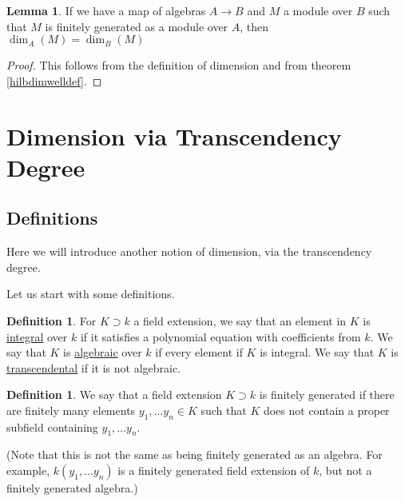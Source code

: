 \documentclass[12 pt]{article}
\theoremstyle{definition}
\newtheorem{lemma}[thm]{Lemma}
\newtheorem{defn}[thm]{Definition}
\renewcommand{\(}{\left(}
\renewcommand{\)}{\right)}
\begin{document}
\begin{lemma} If we have a map of algebras $A \to B$ and $M$ a module over $B$ such that $M$ is finitely generated as a module over $A$, then $\dim_A(M)=\dim_B(M)$
\end{lemma}
\begin{proof} This follows from the definition of dimension and from theorem \ref{hilbdimwelldef}.
\end{proof}


\newpage





\section{Dimension via Transcendency Degree}

\subsection{Definitions}

Here we will introduce another notion of dimension, via the transcendency degree.

Let us start with some definitions.

\begin{defn} For $K \supset k$ a field extension, we say that an element in $K$ is \underline{integral} over $k$ if it satisfies a polynomial equation with coefficients from $k$. We say that $K$ is \underline{algebraic} over $k$ if every element if $K$ is integral. We say that $K$ is \underline{transcendental} if it is not algebraic.
\end{defn}


\begin{defn} We say that a field extension $K \supset k$ is finitely generated if there are finitely many elements $y_1, \ldots y_n \in K$ such that $K$ does not contain a proper subfield containing $y_1, \ldots y_n$.

(Note that this is not the same as being finitely generated as an algebra. For example, $k(y_1, \ldots y_n)$ is a finitely generated field extension of $k$, but not a finitely generated algebra.)
\end{defn}
\end{document}
